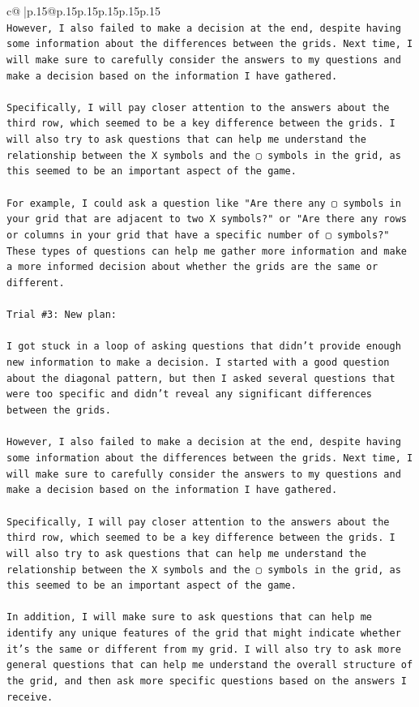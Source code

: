 \documentclass{article}
\begin{document}
{\begin{supertabular}{c@{$\;$}|p{.15\linewidth}@{}p{.15\linewidth}p{.15\linewidth}p{.15\linewidth}p{.15\linewidth}p{.15\linewidth}}
{{{\\ 
\texttt{However, I also failed to make a decision at the end, despite having some information about the differences between the grids. Next time, I will make sure to carefully consider the answers to my questions and make a decision based on the information I have gathered. } \\
\\ 
\texttt{Specifically, I will pay closer attention to the answers about the third row, which seemed to be a key difference between the grids. I will also try to ask questions that can help me understand the relationship between the X symbols and the ▢ symbols in the grid, as this seemed to be an important aspect of the game. } \\
\\ 
\texttt{For example, I could ask a question like "Are there any ▢ symbols in your grid that are adjacent to two X symbols?" or "Are there any rows or columns in your grid that have a specific number of ▢ symbols?" These types of questions can help me gather more information and make a more informed decision about whether the grids are the same or different.} \\
\\ 
\texttt{Trial \#3: New plan: } \\
\\ 
\texttt{I got stuck in a loop of asking questions that didn't provide enough new information to make a decision. I started with a good question about the diagonal pattern, but then I asked several questions that were too specific and didn't reveal any significant differences between the grids. } \\
\\ 
\texttt{However, I also failed to make a decision at the end, despite having some information about the differences between the grids. Next time, I will make sure to carefully consider the answers to my questions and make a decision based on the information I have gathered. } \\
\\ 
\texttt{Specifically, I will pay closer attention to the answers about the third row, which seemed to be a key difference between the grids. I will also try to ask questions that can help me understand the relationship between the X symbols and the ▢ symbols in the grid, as this seemed to be an important aspect of the game. } \\
\\ 
\texttt{In addition, I will make sure to ask questions that can help me identify any unique features of the grid that might indicate whether it's the same or different from my grid. I will also try to ask more general questions that can help me understand the overall structure of the grid, and then ask more specific questions based on the answers I receive. } \\
}}}
\end{supertabular}}
\end{document}
